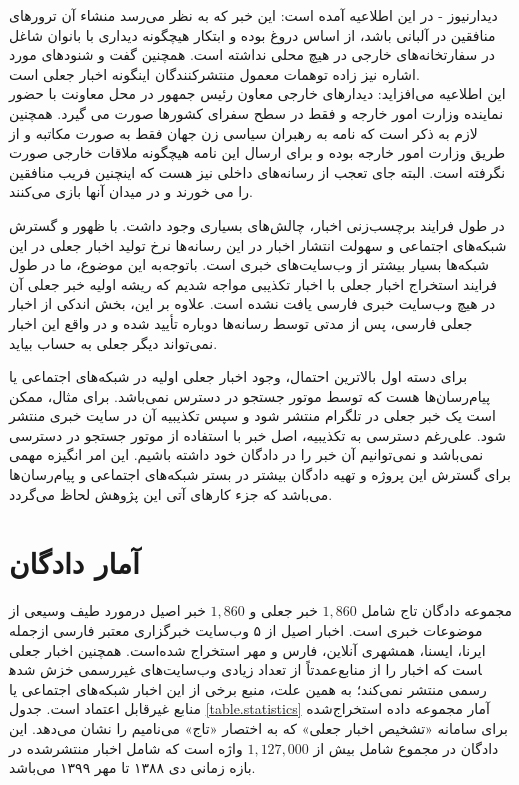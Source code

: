 \begin{enumerate}
دیدارنیوز - در این اطلاعیه آمده است: این خبر که به نظر می‌رسد منشاء آن ترور‌های منافقین در آلبانی باشد، از اساس دروغ بوده و ابتکار هیچگونه دیداری با بانوان شاغل در سفارتخانه‌های خارجی در هیچ محلی نداشته است. همچنین گفت و شنودهای مورد اشاره نیز زاده توهمات معمول منتشرکنندگان اینگونه اخبار جعلی است. 
\\
این اطلاعیه می‌افزاید: دیدارهای خارجی معاون رئیس جمهور در محل معاونت با حضور نماینده وزارت امور خارجه و فقط در سطح سفرای کشورها صورت می گیرد. همچنین لازم به ذکر است که نامه به رهبران سیاسی زن جهان فقط به صورت مکاتبه و از طریق وزارت امور خارجه بوده و برای ارسال این نامه هیچگونه ملاقات خارجی صورت نگرفته است. البته جای تعجب از رسانه‌های داخلی نیز هست که اینچنین فریب منافقین را می خورند و در میدان آنها بازی می‌کنند.
\end{enumerate}

در طول فرایند برچسب‌زنی اخبار، چالش‌های بسیاری وجود داشت. با ظهور و گسترش شبکه‌های اجتماعی و سهولت انتشار اخبار در این رسانه‌ها نرخ تولید اخبار جعلی در این شبکه‌ها بسیار بیشتر از وب‌سایت‌های خبری است. باتوجه‌به این موضوع، ما در طول فرایند استخراج اخبار جعلی با اخبار تکذیبی مواجه شدیم که ریشه اولیه خبر جعلی آن در هیچ وب‌سایت خبری فارسی یافت نشده‌ است. علاوه بر این، بخش اندکی از اخبار جعلی فارسی، پس از مدتی توسط رسانه‌ها دوباره تأیید شده و در واقع این اخبار نمی‌تواند دیگر جعلی به حساب بیاید.

برای دسته اول بالاترین احتمال، وجود اخبار جعلی اولیه در شبکه‌های اجتماعی یا پیام‌رسان‌ها هست که توسط موتور جستجو در دسترس نمی‌باشد. برای مثال، ممکن است یک خبر جعلی در تلگرام منتشر شود و سپس تکذیبیه آن در سایت خبری منتشر شود. علی‌رغم دسترسی به تکذیبیه، اصل خبر با استفاده از موتور جستجو در دسترسی نمی‌باشد و نمی‌توانیم آن خبر را در دادگان خود داشته باشیم. این امر انگیزه مهمی برای گسترش این پروژه و تهیه دادگان بیشتر در بستر شبکه‌های اجتماعی و پیام‌رسان‌ها می‌باشد که جزء کارهای آتی این پژوهش لحاظ می‌گردد.
\section{آمار دادگان}
مجموعه دادگان تاج شامل $1,860$ خبر جعلی و $1,860$ خبر اصیل درمورد طیف وسیعی از موضوعات خبری است. اخبار اصیل از ۵ وب‌سایت خبرگزاری معتبر فارسی ازجمله ایرنا، ایسنا، همشهری آنلاین، فارس و مهر استخراج شده‌است. همچنین اخبار جعلی عمدتاً از تعداد زیادی وب‌سایت‌های غیررسمی خزش‌ شده‎است که اخبار را از منابع رسمی منتشر نمی‌کند؛ به همین علت، منبع برخی از این اخبار شبکه‌های اجتماعی یا منابع غیرقابل اعتماد است.
جدول \ref{table.statistics} آمار مجموعه داده استخراج‌شده برای سامانه «تشخیص اخبار جعلی» که به اختصار «تاج» می‌نامیم  را نشان می‌دهد. این دادگان در مجموع شامل بیش از $1,127,000$ واژه است که  شامل اخبار منتشرشده در بازه زمانی دی ۱۳۸۸ تا مهر ۱۳۹۹ می‌باشد. 

